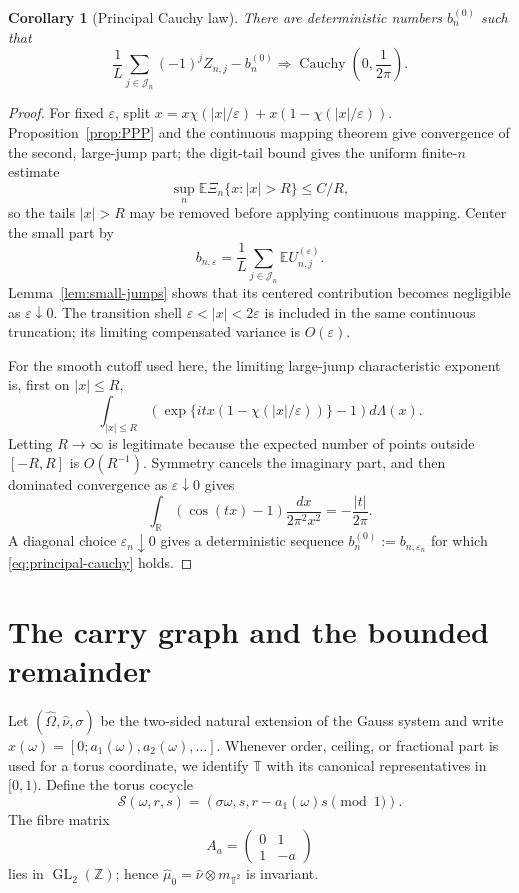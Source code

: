 \documentclass[11pt,a4paper]{amsart}
\newtheorem{corollary}[theorem]{Corollary}
\theoremstyle{definition}
\theoremstyle{remark}
\newcommand{\T}{\mathbb T}
\newcommand{\Z}{\mathbb Z}
\newcommand{\R}{\mathbb R}
\newcommand{\E}{\mathbb E}
\begin{document}
\begin{corollary}[Principal Cauchy law]\label{cor:principal-cauchy}
There are deterministic numbers $b_n^{(0)}$ such that
\begin{equation}\label{eq:principal-cauchy}
 \frac1L\sum_{j\in\mathcal J_n}(-1)^jZ_{n,j}-b_n^{(0)}
 \Longrightarrow \operatorname{Cauchy}\!\left(0,\frac1{2\pi}\right).
\end{equation}
\end{corollary}

\begin{proof}
For fixed $\varepsilon$, split $x=x\chi(|x|/\varepsilon)
+x(1-\chi(|x|/\varepsilon))$.  Proposition~\ref{prop:PPP} and the
continuous mapping theorem give convergence of the second, large-jump part;
the digit-tail bound gives the uniform finite-$n$ estimate
\[
 \sup_n\E\Xi_n\{x:|x|>R\}\le C/R,
\]
so the tails $|x|>R$ may be removed before applying continuous mapping.
Center the small part by
\[
 b_{n,\varepsilon}=\frac1L\sum_{j\in\mathcal J_n}
 \E U_{n,j}^{(\varepsilon)}.
\]
Lemma~\ref{lem:small-jumps} shows that its centered contribution becomes
negligible as $\varepsilon\downarrow0$.  The transition shell
$\varepsilon<|x|<2\varepsilon$ is included in the same continuous
truncation; its limiting compensated variance is $O(\varepsilon)$.

For the smooth cutoff used here, the limiting large-jump characteristic
exponent is, first on $|x|\le R$,
\[
 \int_{|x|\le R}
 \left(\exp\{itx(1-\chi(|x|/\varepsilon))\}-1\right)d\Lambda(x).
\]
Letting $R\to\infty$ is legitimate because the expected number of points
outside $[-R,R]$ is $O(R^{-1})$.  Symmetry cancels the imaginary part, and
then dominated convergence as $\varepsilon\downarrow0$ gives
\[
 \int_{\R}(\cos(tx)-1)\frac{dx}{2\pi^2x^2}
 =-\frac{|t|}{2\pi}.
\]
A diagonal choice $\varepsilon_n\downarrow0$ gives a deterministic sequence
$b_n^{(0)}:=b_{n,\varepsilon_n}$ for which
\eqref{eq:principal-cauchy} holds.
\end{proof}





\section{The carry graph and the bounded remainder}

Let $(\widehat\Omega,\widehat\nu,\sigma)$ be the two-sided natural extension
of the Gauss system and write $x(\omega)=[0;a_1(\omega),a_2(\omega),\ldots]$.
Whenever order, ceiling, or fractional part is used for a torus coordinate,
we identify $\T$ with its canonical representatives in $[0,1)$.
Define the torus cocycle
\begin{equation}\label{eq:S-cocycle}
 \mathcal S(\omega,r,s)=
 (\sigma\omega,s,r-a_1(\omega)s\pmod1).
\end{equation}
The fibre matrix
\[
 A_a=\begin{pmatrix}0&1\\1&-a\end{pmatrix}
\]
lies in $\operatorname{GL}_2(\Z)$; hence
$\widehat\mu_0=\widehat\nu\otimes m_{\T^2}$ is invariant.
\end{document}
